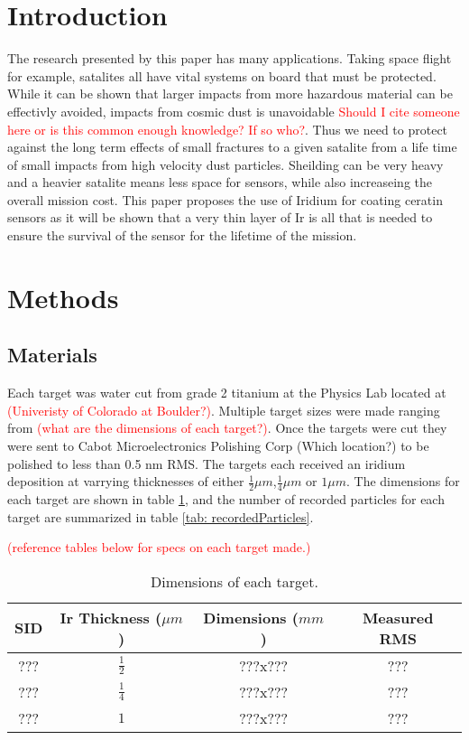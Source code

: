 \documentclass[review]{elsarticle}
\begin{document}
	\section{Introduction}
		The research presented by this paper has many applications. Taking space flight for example, satalites all have vital systems
		on board that must be protected. While it can be shown that larger impacts from more hazardous material can be effectivly
		avoided, impacts from cosmic dust is unavoidable \textcolor{red}{Should I cite someone here or is this common enough knowledge?
		 If so who?}. Thus we need to protect against the long term effects of small fractures to 
		a given satalite from a life time of small impacts from high velocity dust particles. Sheilding can be very heavy and a heavier
		satalite means less space for sensors, while also increaseing the overall mission cost. This paper proposes the use of Iridium
		for coating ceratin sensors as it will be shown that a very thin layer of Ir is all that is needed to ensure the survival of
		the sensor for the lifetime of the mission.

	\section{Methods}
		\subsection{Materials}	
		Each target was water cut from grade 2 titanium at the Physics Lab located at \textcolor{red}{(Univeristy of Colorado at 
		Boulder?)}. Multiple target sizes were made ranging from \textcolor{red}{(what are the dimensions of each target?)}. 
		Once the targets were cut they were sent to Cabot Microelectronics Polishing Corp (Which location?) to be polished to less
		than 0.5 nm RMS. The targets each received an iridium deposition at varrying thicknesses of either 
		$\frac{1}{2}\mu m$,$\frac{1}{4}\mu m$ or $1\mu m $. The dimensions for each target are shown in table \ref{tab: targetDims}, and
		the number of recorded particles for each target are summarized in table \ref{tab: recordedParticles}.
		
		\textcolor{red}{(reference tables below for specs on each target made.)}
		\begin{table}
			\begin{center}
				\begin{tabular}{c|c|c|c} 
				SID & Ir Thickness ($\mu m$) & Dimensions ($mm$) & Measured RMS \\ 
				\hline 
				??? & $\frac{1}{2}$		 & ???x???			     & ???\\
				\hline
				??? & $\frac{1}{4}$		 & ???x???			     & ???\\
				\hline
				??? & $1$		 		 & ???x???			     & ???\\
						
				\end{tabular}
			\end{center}
		\caption
		{
			\label{tab: targetDims}
			Dimensions of each target.
		}
		\end{table}
\end{document}
